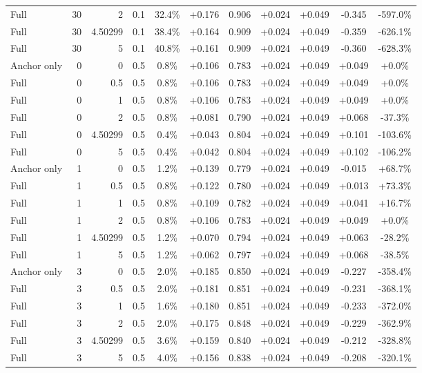 \begin{table}[htbp]
\begin{tabular}{lrrrccccccc}
Full & 30 & 2 & 0.1 & 32.4\% & +0.176 & 0.906 & +0.024 & +0.049 & -0.345 & -597.0\% \\
Full & 30 & 4.50299 & 0.1 & 38.4\% & +0.164 & 0.909 & +0.024 & +0.049 & -0.359 & -626.1\% \\
Full & 30 & 5 & 0.1 & 40.8\% & +0.161 & 0.909 & +0.024 & +0.049 & -0.360 & -628.3\% \\
Anchor only & 0 & 0 & 0.5 & 0.8\% & +0.106 & 0.783 & +0.024 & +0.049 & +0.049 & +0.0\% \\
Full & 0 & 0.5 & 0.5 & 0.8\% & +0.106 & 0.783 & +0.024 & +0.049 & +0.049 & +0.0\% \\
Full & 0 & 1 & 0.5 & 0.8\% & +0.106 & 0.783 & +0.024 & +0.049 & +0.049 & +0.0\% \\
Full & 0 & 2 & 0.5 & 0.8\% & +0.081 & 0.790 & +0.024 & +0.049 & +0.068 & -37.3\% \\
Full & 0 & 4.50299 & 0.5 & 0.4\% & +0.043 & 0.804 & +0.024 & +0.049 & +0.101 & -103.6\% \\
Full & 0 & 5 & 0.5 & 0.4\% & +0.042 & 0.804 & +0.024 & +0.049 & +0.102 & -106.2\% \\
Anchor only & 1 & 0 & 0.5 & 1.2\% & +0.139 & 0.779 & +0.024 & +0.049 & -0.015 & +68.7\% \\
Full & 1 & 0.5 & 0.5 & 0.8\% & +0.122 & 0.780 & +0.024 & +0.049 & +0.013 & +73.3\% \\
Full & 1 & 1 & 0.5 & 0.8\% & +0.109 & 0.782 & +0.024 & +0.049 & +0.041 & +16.7\% \\
Full & 1 & 2 & 0.5 & 0.8\% & +0.106 & 0.783 & +0.024 & +0.049 & +0.049 & +0.0\% \\
Full & 1 & 4.50299 & 0.5 & 1.2\% & +0.070 & 0.794 & +0.024 & +0.049 & +0.063 & -28.2\% \\
Full & 1 & 5 & 0.5 & 1.2\% & +0.062 & 0.797 & +0.024 & +0.049 & +0.068 & -38.5\% \\
Anchor only & 3 & 0 & 0.5 & 2.0\% & +0.185 & 0.850 & +0.024 & +0.049 & -0.227 & -358.4\% \\
Full & 3 & 0.5 & 0.5 & 2.0\% & +0.181 & 0.851 & +0.024 & +0.049 & -0.231 & -368.1\% \\
Full & 3 & 1 & 0.5 & 1.6\% & +0.180 & 0.851 & +0.024 & +0.049 & -0.233 & -372.0\% \\
Full & 3 & 2 & 0.5 & 2.0\% & +0.175 & 0.848 & +0.024 & +0.049 & -0.229 & -362.9\% \\
Full & 3 & 4.50299 & 0.5 & 3.6\% & +0.159 & 0.840 & +0.024 & +0.049 & -0.212 & -328.8\% \\
Full & 3 & 5 & 0.5 & 4.0\% & +0.156 & 0.838 & +0.024 & +0.049 & -0.208 & -320.1\% \\

\end{tabular}
\end{table}
